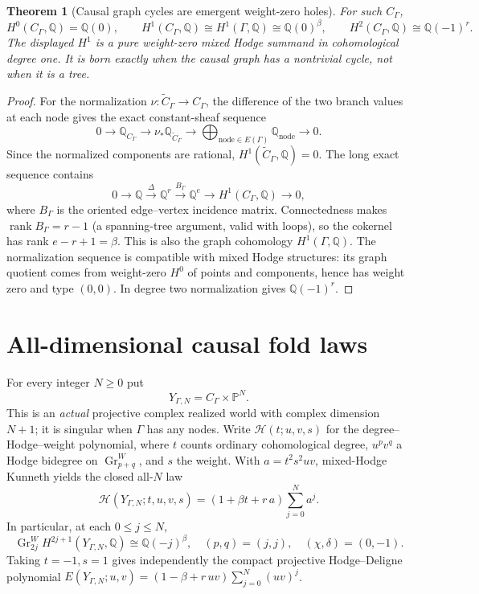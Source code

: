 \documentclass[11pt]{article}
\newtheorem{theorem}{Theorem}
\begin{document}
\begin{theorem}[Causal graph cycles are emergent weight-zero holes]
For such $C_\Gamma$,
\[
 H^0(C_\Gamma,\mathbb Q)=\mathbb Q(0),\qquad
 H^1(C_\Gamma,\mathbb Q)\cong H^1(\Gamma,\mathbb Q)
       \cong\mathbb Q(0)^\beta,\qquad
 H^2(C_\Gamma,\mathbb Q)\cong\mathbb Q(-1)^r.
\]
The displayed $H^1$ is a pure weight-zero mixed Hodge summand in
cohomological degree one. It is born exactly when the causal graph has
a nontrivial cycle, not when it is a tree.
\end{theorem}
\begin{proof}
For the normalization $\nu:\widetilde C_\Gamma\to C_\Gamma$,
the difference of the two branch values at each node gives the exact
constant-sheaf sequence
\[
0\to\mathbb Q_{C_\Gamma}\to
\nu_*\mathbb Q_{\widetilde C_\Gamma}\to
\bigoplus_{\mathrm{node}\in E(\Gamma)}\mathbb Q_{\mathrm{node}}\to0.
\]
Since the normalized components are rational,
$H^1(\widetilde C_\Gamma,\mathbb Q)=0$.  The long exact sequence
contains
\[
0\to\mathbb Q\xrightarrow{\Delta}\mathbb Q^r
\xrightarrow{B_\Gamma}\mathbb Q^e
\to H^1(C_\Gamma,\mathbb Q)\to0,
\]
where $B_\Gamma$ is the oriented edge--vertex incidence matrix.
Connectedness makes $\operatorname{rank} B_\Gamma=r-1$ (a
spanning-tree argument, valid with loops), so the cokernel has rank
$e-r+1=\beta$.  This is also the graph cohomology $H^1(\Gamma,\mathbb Q)$.
The normalization sequence is compatible with mixed Hodge structures:
its graph quotient comes from weight-zero $H^0$ of points and
components, hence has weight zero and type $(0,0)$.
In degree two normalization gives $\mathbb Q(-1)^r$.
\end{proof}

\section{All-dimensional causal fold laws}
For every integer $N\geq0$ put
\[
       Y_{\Gamma,N}=C_\Gamma\times\mathbb P^N.
\]
This is an \emph{actual} projective complex realized world with complex
dimension $N+1$; it is singular when $\Gamma$ has any nodes.
Write $\mathcal H(t;u,v,s)$ for the degree--Hodge--weight polynomial,
where $t$ counts ordinary cohomological degree, $u^pv^q$ a Hodge
bidegree on $\operatorname{Gr}^W_{p+q}$, and $s$ the weight.
With $a=t^2s^2uv$, mixed-Hodge Kunneth yields the closed all-$N$ law
\[
\boxed{\quad
  \mathcal H(Y_{\Gamma,N};t,u,v,s)
  =(1+\beta t+r\,a)\sum_{j=0}^N a^j.
 \quad} \tag{1}
\]
In particular, at each $0\leq j\leq N$,
\[
\boxed{\ \operatorname{Gr}^{W}_{2j}
 H^{2j+1}(Y_{\Gamma,N},\mathbb Q)
 \cong\mathbb Q(-j)^\beta,\quad
 (p,q)=(j,j),\quad(\chi,\delta)=(0,-1).\ }\tag{2}
\]
Taking $t=-1,s=1$ gives independently the compact projective
Hodge--Deligne polynomial
$E(Y_{\Gamma,N};u,v)=(1-\beta+r\,uv)
\sum_{j=0}^N(uv)^j$.
\end{document}
